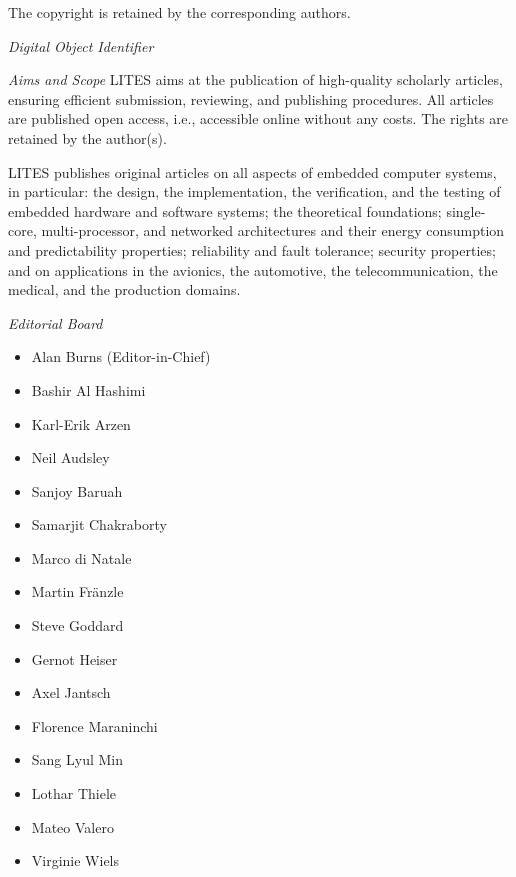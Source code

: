 \documentclass[a4paper,UKenglish]{litesmaster-v2021}
\begin{document}
\begin{publicationinfo}
The copyright is retained by the corresponding authors.

\vfill
\emph{Digital Object Identifier}\newline
\printIssueDOI

\newpage


\bigskip

\emph{Aims and Scope}\newline
LITES aims at the publication of high-quality scholarly articles, ensuring efficient submission, reviewing, and publishing procedures. All articles are published open access, i.e., accessible online without any costs. The rights are retained by the author(s).

\medskip

LITES publishes original articles on all aspects of embedded computer systems, in particular: the design, the implementation, the verification, and the testing of embedded hardware and software systems; the theoretical foundations; single-core, multi-processor, and networked architectures and their energy consumption and predictability properties; reliability and fault tolerance; security properties; and on applications in the avionics, the automotive, the telecommunication, the medical, and the production domains. 

\bigskip

\emph{Editorial Board}
\begin{itemize}
\item Alan Burns (Editor-in-Chief)%
\item Bashir Al Hashimi %
\item Karl-Erik Arzen %
\item Neil Audsley %
\item Sanjoy Baruah %
\item Samarjit Chakraborty %
\item Marco di Natale %
\item Martin Fr\"anzle %
\item Steve Goddard %
\item Gernot Heiser%
\item Axel Jantsch %
\item Florence Maraninchi %
\item Sang Lyul Min %
\item Lothar Thiele %
\item Mateo Valero %
\item Virginie Wiels %
\end{itemize}


\end{publicationinfo}
\end{document}

